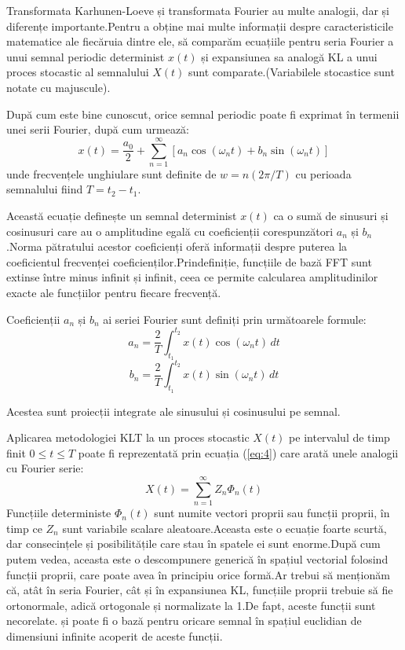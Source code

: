 \documentclass[12pt]{report}
\begin{document}
Transformata Karhunen-Loeve și transformata Fourier au multe analogii, dar și diferențe importante.\@ Pentru a obține mai multe informații despre caracteristicile matematice ale fiecăruia dintre ele, să comparăm ecuațiile pentru seria Fourier a unui semnal periodic determinist \(x( t)\) și expansiunea sa analogă KL a unui proces stocastic al semnalului \(X(t)\) sunt comparate.\@ (Variabilele stocastice sunt notate cu majuscule).

După cum este bine cunoscut, orice semnal periodic poate fi exprimat în termenii unei serii Fourier, după cum urmează:
\begin{equation}
	x(t)=\frac{a_0}{2}+\sum_{n=1}^{\infty}[a_n\cos({\omega_n}t)+b_n\sin({\omega_n}t)]
\end{equation}\label{eq:1}
unde frecvențele unghiulare sunt definite de \(w = n(2\pi/ T)\) cu perioada semnalului fiind \(T=t_2-t_1\).

Această ecuație definește un semnal determinist \(x(t)\) ca o sumă de sinusuri și cosinusuri care au o amplitudine egală cu coeficienții corespunzători \(a_n\) și \(b_n\).\@ Norma pătratului acestor coeficienți oferă informații despre puterea la coeficientul frecvenței coeficienților.\@ Prin\linebreak definiție, funcțiile de bază FFT sunt extinse între minus infinit și infinit, ceea ce permite calcularea amplitudinilor exacte ale funcțiilor pentru fiecare frecvență.

Coeficienții \(a_n\) și \(b_n\) ai seriei Fourier sunt definiți prin următoarele formule:
\begin{equation}
	a_n=\frac{2}{T}\int_{t_1}^{t_2}x(t)\cos({\omega_n}t)\,dt
	\label{eq:2}
\end{equation}
\begin{equation}
	b_n=\frac{2}{T}\int_{t_1}^{t_2}x(t)\sin({\omega_n}t)\,dt
	\label{eq:3}
\end{equation}

Acestea sunt proiecții integrate ale sinusului și cosinusului pe semnal.

Aplicarea metodologiei KLT la un proces stocastic \(X(t)\) pe intervalul de timp finit $0 \leq t \leq T$ poate fi reprezentată prin ecuația (\ref{eq:4}) care arată unele analogii cu Fourier serie:
\begin{equation}
	X(t)=\sum_{n=1}^{\infty}Z_n\Phi_n(t)
	\label{eq:4}
\end{equation}
Funcțiile deterministe $\Phi_n(t)$ sunt numite vectori proprii sau funcții proprii, în timp ce $Z_n$ sunt variabile scalare aleatoare.\@ Aceasta este o ecuație foarte scurtă, dar consecințele și posibilitățile care stau în spatele ei sunt enorme.\@ După cum putem vedea, aceasta este o descompunere generică în spațiul vectorial folosind funcții proprii,
care poate avea în principiu orice formă.\@ Ar trebui să menționăm că, atât în seria Fourier, cât și în expansiunea KL, funcțiile proprii trebuie să fie ortonormale, adică ortogonale și normalizate la 1.\@ De fapt, aceste funcții sunt necorelate. și poate fi o bază pentru oricare
semnal în spațiul euclidian de dimensiuni infinite acoperit de aceste funcții.
\end{document}
